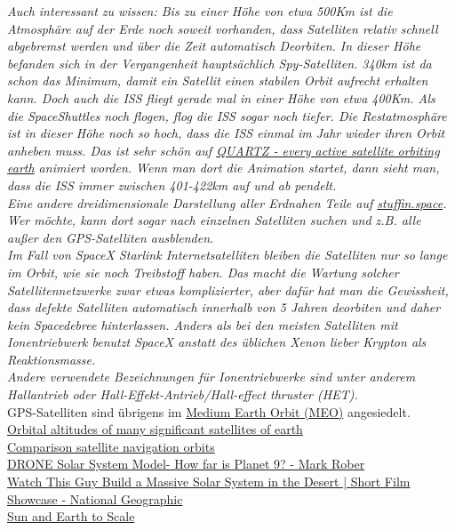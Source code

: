 \documentclass[12pt,paper=A4,numbers=noenddot,bibliography=totoc,listof=totoc,DIV=11,BCOR=1mm]{scrreprt}
\begin{document}
\emph{Auch interessant zu wissen: Bis zu einer Höhe von etwa 500Km ist die Atmosphäre auf der Erde noch soweit vorhanden, dass Satelliten relativ schnell abgebremst werden und über die Zeit automatisch Deorbiten. In dieser Höhe befanden sich in der Vergangenheit hauptsächlich Spy-Satelliten. 340km ist da schon das Minimum, damit ein Satellit einen stabilen Orbit aufrecht erhalten kann.
Doch auch die ISS fliegt gerade mal in einer Höhe von etwa 400Km. Als die SpaceShuttles noch flogen, flog die ISS sogar noch tiefer. Die Restatmosphäre ist in dieser Höhe noch so hoch, dass die ISS einmal im Jahr wieder ihren Orbit anheben muss. Das ist sehr schön auf \href{https://qz.com/296941/interactive-graphic-every-active-satellite-orbiting-earth/}{QUARTZ - every active satellite orbiting earth} animiert worden. Wenn man dort die Animation startet, dann sieht man, dass die ISS immer zwischen 401-422km auf und ab pendelt.\\
Eine andere dreidimensionale Darstellung aller Erdnahen Teile auf \href{http://stuffin.space/}{stuffin.space}. Wer möchte, kann dort sogar nach einzelnen Satelliten suchen und z.B. alle außer den GPS-Satelliten ausblenden.\\
Im Fall von SpaceX Starlink Internetsatelliten bleiben die Satelliten nur so lange im Orbit, wie sie noch Treibstoff haben. Das macht die Wartung solcher Satellitennetzwerke zwar etwas komplizierter, aber dafür hat man die Gewissheit, dass defekte Satelliten automatisch innerhalb von 5 Jahren deorbiten und daher kein Spacedebree hinterlassen. Anders als bei den meisten Satelliten mit Ionentriebwerk benutzt SpaceX anstatt des üblichen Xenon lieber Krypton als Reaktionsmasse.\\
Andere verwendete Bezeichnungen für Ionentriebwerke sind unter anderem Hallantrieb oder Hall-Effekt-Antrieb/Hall-effect thruster (HET).}\\

GPS-Satelliten sind übrigens im \href{https://en.wikipedia.org/wiki/Medium_Earth_orbit}{Medium Earth Orbit (MEO)} angesiedelt.\\
\href{https://upload.wikimedia.org/wikipedia/commons/8/82/Orbitalaltitudes.jpg}{Orbital altitudes of many significant satellites of earth}\\
\href{https://upload.wikimedia.org/wikipedia/commons/b/b4/Comparison_satellite_navigation_orbits.svg}{Comparison satellite navigation orbits}\\


\href{https://youtu.be/pR5VJo5ifdE}{DRONE Solar System Model- How far is Planet 9? - Mark Rober}\\
\href{https://youtu.be/Kj4524AAZdE}{Watch This Guy Build a Massive Solar System in the Desert | Short Film Showcase - National Geographic}\\
\href{https://www.helioviewer.org/}{Sun and Earth to Scale}\\
\end{document}
